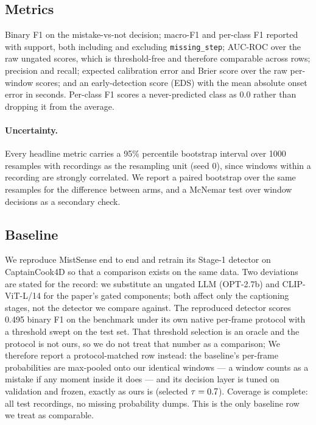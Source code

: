\documentclass[10pt,twocolumn]{article}
\begin{document}
\subsection{Metrics}
Binary F1 on the mistake-vs-not decision; macro-F1 and per-class F1 reported with
support, both including and excluding \texttt{missing\_step}; AUC-ROC over the
raw ungated scores, which is threshold-free and therefore comparable across
rows; precision and recall; expected calibration error and Brier score over the
raw per-window scores; and an early-detection score (EDS) with the mean absolute
onset error in seconds. Per-class F1 scores a never-predicted class as $0.0$
rather than dropping it from the average.

\paragraph{Uncertainty.} Every headline metric carries a 95\% percentile
bootstrap interval over 1000 resamples with recordings as the resampling unit
(seed 0), since windows within a recording are strongly correlated. We report a
paired bootstrap over the same resamples for the difference between arms, and a
McNemar test over window decisions as a secondary check.

\subsection{Baseline}
We reproduce MistSense \citep{patsch2025mistsense} end to end and retrain its
Stage-1 detector on CaptainCook4D so that a comparison exists on the same data.
Two deviations are stated for the record: we substitute an ungated LLM
(OPT-2.7b) and CLIP-ViT-L/14 for the paper's gated components; both affect only
the captioning stages, not the detector we compare against. The reproduced
detector scores 0.495 binary F1 on the benchmark under its own native per-frame
protocol with a threshold swept on the test set. That threshold selection is an
oracle and the protocol is not ours, so we do not treat that number as a
comparison; We therefore report a
protocol-matched row instead: the baseline's per-frame probabilities are
max-pooled onto our identical \resWindows{} windows --- a window counts as a
mistake if any moment inside it does --- and its decision layer is tuned on
validation and frozen, exactly as ours is (selected $\tau=0.7$). Coverage is
complete: all \resClips{} test recordings, no missing probability dumps. This is
the only baseline row we treat as comparable.
\end{document}
